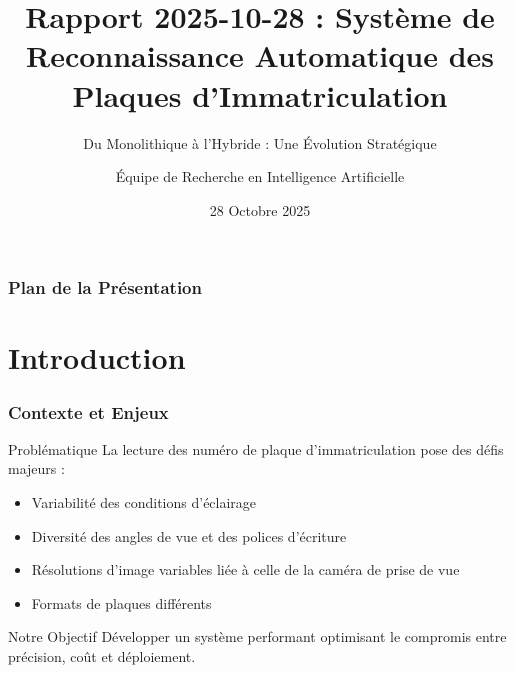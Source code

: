 \documentclass[
	11pt,
	aspectratio=169,
]{beamer}
\title[ALPR]{Rapport 2025-10-28 : Système de Reconnaissance Automatique des Plaques d'Immatriculation} %
\subtitle{Du Monolithique à l'Hybride : Une Évolution Stratégique}
\author[Équipe IA]{Équipe de Recherche en Intelligence Artificielle}
\institute[UATM]{
	UATM GASA FORMATION\\
	\smallskip
	\textit{info@uatm-gasa.com}
}
\date[28 Oct 2025]{28 Octobre 2025}
\begin{document}

\begin{frame}
	\titlepage
\end{frame}


\begin{frame}
	\frametitle{Plan de la Présentation}
	\tableofcontents
\end{frame}


\section{Introduction}

\begin{frame}
	\frametitle{Contexte et Enjeux}
	
	\begin{block}{Problématique}
		La lecture des numéro de plaque d'immatriculation pose des défis majeurs :
		\begin{itemize}
			\item Variabilité des conditions d'éclairage
			\item Diversité des angles de vue et des polices d'écriture
			\item Résolutions d'image variables liée à celle de la caméra
			de prise de vue
			\item Formats de plaques différents
		\end{itemize}
	\end{block}
	
	
	\begin{exampleblock}{Notre Objectif}
		Développer un système performant optimisant le compromis entre précision, coût et déploiement.
	\end{exampleblock}
\end{frame}

\end{document}
